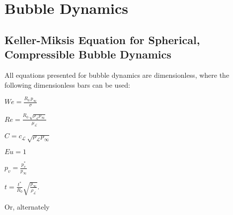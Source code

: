 \chapter{Bubble Dynamics}   \label{chap:BubbleDynamics}%
\section[Keller-Miksis]{Keller-Miksis Equation for Spherical, Compressible Bubble Dynamics}
All equations presented for bubble dynamics are dimensionless, where the following dimensionless bars can be used:
%

\begin{center}

\begin{minipage}{.32\textwidth}
$We = \frac{R_0 \, p_\infty}{\sigma}$
\end{minipage}
\begin{minipage}{.32\textwidth}
$Re = \frac{R_0 \, \sqrt{\rho_\mathcal{L} p_\infty}}{\mu_\mathcal{L}}$
\end{minipage}
\begin{minipage}{.32\textwidth}
$C = c_\mathcal{L} \, \sqrt{\rho_\mathcal{L} p_\infty}$
\end{minipage}
\vspace*{.5cm}
\begin{minipage}{.32\textwidth}
$Eu = 1$
\end{minipage}
\begin{minipage}{.32\textwidth}
$p_v = \frac{p_v^*}{p_\infty}$
\end{minipage}
\begin{minipage}{.32\textwidth}
$t = \frac{t^*}{R_0}\sqrt{\frac{p_\infty}{\rho_\mathcal{L}}}$.
\end{minipage}

\end{center}

%

Or, alternately

